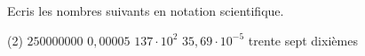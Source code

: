 %
%
Ecris les nombres suivants en notation scientifique.
	\begin{tasks}(2)
		\task $250000000$
		\task $0,00005$
		\task $137\cdot 10^2$
		\task $35,69\cdot 10^{-5}$
		\task trente sept dixièmes
	\end{tasks}
